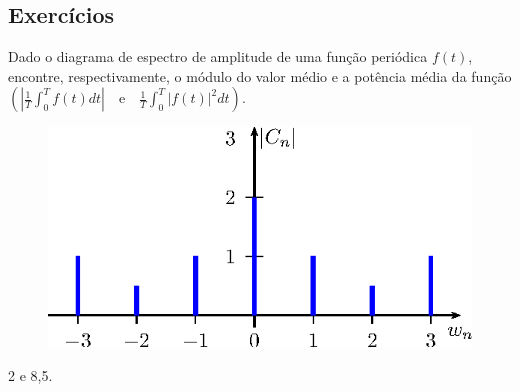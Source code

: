 \subsection*{Exercícios}
\begin{exer}Dado o diagrama de espectro de amplitude de uma função periódica $f(t)$, encontre, respectivamente, o módulo do valor médio e a potência média da função $\left(\left|\frac{1}{T}\int_0^Tf(t)dt\right|\quad\text{e}\quad \frac{1}{T}\int_0^T|f(t)|^2dt\right)$.\\
\begin{figure}[!ht]
\begin{center}
\includegraphics{cap_propriedades_series/pics/figura_4}
\end{center}
\end{figure}

\end{exer}
\begin{resp} 2 e 8,5.
\end{resp}
